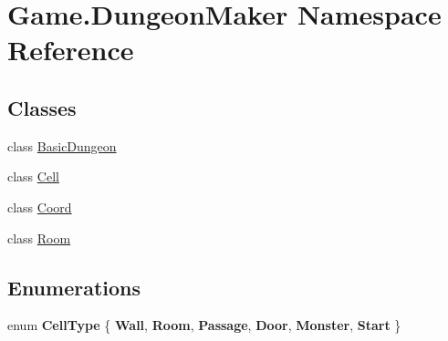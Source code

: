 \hypertarget{namespace_game_1_1_dungeon_maker}{}\section{Game.\+Dungeon\+Maker Namespace Reference}
\label{namespace_game_1_1_dungeon_maker}
\subsection*{Classes}
\begin{DoxyCompactItemize}
\item 
class \mbox{\hyperlink{class_game_1_1_dungeon_maker_1_1_basic_dungeon}{Basic\+Dungeon}}
\item 
class \mbox{\hyperlink{class_game_1_1_dungeon_maker_1_1_cell}{Cell}}
\item 
class \mbox{\hyperlink{class_game_1_1_dungeon_maker_1_1_coord}{Coord}}
\item 
class \mbox{\hyperlink{class_game_1_1_dungeon_maker_1_1_room}{Room}}
\end{DoxyCompactItemize}
\subsection*{Enumerations}
\begin{DoxyCompactItemize}
\item 
\mbox{\label{namespace_game_1_1_dungeon_maker_a273077f254859c9a5f8ffd82ebe5229b}} 
enum {\bfseries Cell\+Type} \{ \newline
{\bfseries Wall}, 
{\bfseries Room}, 
{\bfseries Passage}, 
{\bfseries Door}, 
\newline
{\bfseries Monster}, 
{\bfseries Start}
 \}
\end{DoxyCompactItemize}
